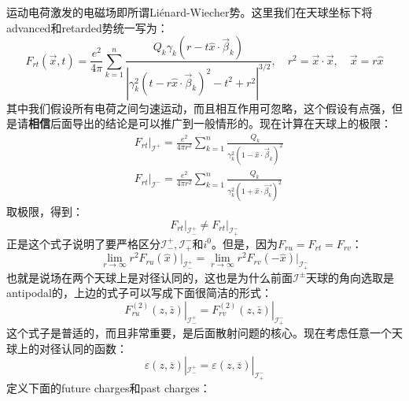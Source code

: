 运动电荷激发的电磁场即所谓Li\'enard\mbox{-}Wiecher势\cite{Jackson1998ClassicalE3}。这里我们在天球坐标下将advanced和retarded势统一写为：
\begin{equation}
	F_{rt}(\vec{x},t)=\frac{e^2}{4\pi}\sum_{k=1}^n\frac{Q_k\gamma_k\left(r-t\hat{x}\cdot\vec{\beta}_k\right)}{\left|\gamma_k^2\left(t-r\hat{x}\cdot\vec{\beta}_k\right)^2-t^2+r^2\right|^{3/2}},\quad r^2=\vec{x}\cdot\vec{x},\quad\vec{x}=r\hat{x}
\end{equation}
其中我们假设所有电荷之间匀速运动，而且相互作用可忽略，这个假设有点强，但是请\textbf{相信}后面导出的结论是可以推广到一般情形的。现在计算在天球上的极限：
\begin{equation}
	\begin{aligned}
		&\left.F_{rt}\right|_{\mathcal{I}^{+}}=\frac{e^{2}}{4\pi r^{2}}\sum_{k=1}^{n}\frac{Q_{k}}{\gamma_{k}^{2}(1-\hat{x}\cdot\vec{\beta}_{k})^{2}}\\
		&\left.F_{rt}\right|_{\mathcal{I}^{-}}=\frac{e^{2}}{4\pi r^{2}}\sum_{k=1}^{n}\frac{Q_{k}}{\gamma_{k}^{2}(1+\hat{x}\cdot\vec{\beta_{k}})^{2}}
	\end{aligned}
\end{equation}
取极限，得到：
\begin{equation}
	\boxed{
	\left.F_{rt}\right|_{\mathcal{I}^{+}_-}\neq \left.F_{rt}\right|_{\mathcal{I}^{-}_+}}
\end{equation}
正是这个式子说明了要严格区分$\mathcal{I}^{+}_-,\mathcal{I}^{-}_{+}$和$i^0$。但是，因为$F_{ru}=F_{rt}=F_{rv}$：
\begin{equation}
	\boxed{
		\lim\limits_{r\to\infty}r^2F_{ru}(\hat{x})\Big|_{\mathcal{I}_{-}^+}=\lim\limits_{r\to\infty}r^2F_{rv}(-\hat{x})\Big|_{\mathcal{I}_{+}^-}
	}
\end{equation}
也就是说场在两个天球上是对径认同的，这也是为什么前面$\mathcal{I}^{\pm}$天球的角向选取是antipodal的，上边的式子可以写成下面很简洁的形式：
\begin{equation}
	\boxed{
	\left.F_{ru}^{(2)}(z,\bar z)\right|_{\mathcal{I}^{+}_-}=\left.F_{rv}^{(2)}(z,\bar z)\right|_{\mathcal{I}^{-}_+}
	}
\end{equation}
这个式子是普适的，而且非常重要，是后面散射问题的核心。现在考虑任意一个天球上的对径认同的函数：
\begin{equation}
	\varepsilon(z,\overline{z})|_{\mathcal{I}_{-}^{+}}=\varepsilon(z,\overline{z})|_{\mathcal{I}_{+}^{-}}
\end{equation}
定义下面的future charges和past charges：
